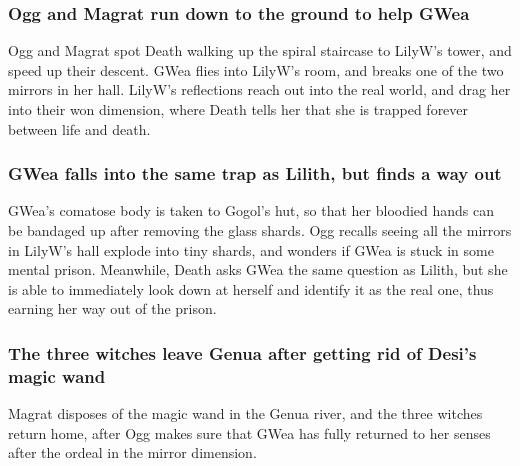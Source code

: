 \subsubsection{\Gls{Ogg} and \Gls{Magrat} run down to the ground to help \Gls{GWea}}
\Gls{Ogg} and \Gls{Magrat} spot \Gls{Death} walking up the spiral staircase to \Gls{LilyW}'s tower,
and speed up their descent. \Gls{GWea} flies into \Gls{LilyW}'s room, and breaks one of the two
mirrors in her hall. \Gls{LilyW}'s reflections reach out into the real world, and drag her into
their won dimension, where \Gls{Death} tells her that she is trapped forever between life and
death.

\subsubsection{\Gls{GWea} falls into the same trap as \Gls{Lilith}, but finds a way out}
\Gls{GWea}'s comatose body is taken to \Gls{Gogol}'s hut, so that her bloodied hands can be
bandaged up after removing the glass shards. \Gls{Ogg} recalls seeing all the mirrors in
\Gls{LilyW}'s hall explode into tiny shards, and wonders if \Gls{GWea} is stuck in some mental
prison. Meanwhile, \Gls{Death} asks \Gls{GWea} the same question as \Gls{Lilith}, but she is able to
immediately look down at herself and identify it as the real one, thus earning her way out of the
prison.

\subsubsection{The three witches leave Genua after getting rid of \Gls{Desi}'s magic wand}
\Gls{Magrat} disposes of the magic wand in the Genua river, and the three witches return home,
after \Gls{Ogg} makes sure that \Gls{GWea} has fully returned to her senses after the ordeal in the
mirror dimension.
